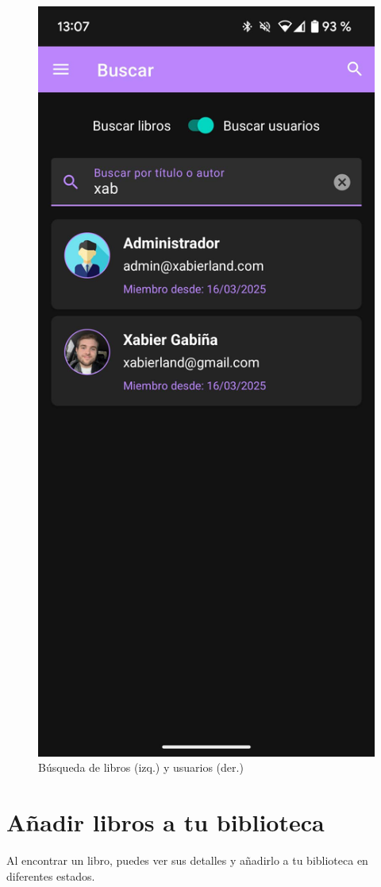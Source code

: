 \documentclass[a4paper,12pt]{report}
\begin{document}
\begin{multicols}{2}
\begin{figure}[H]
          \includegraphics[width=0.47\linewidth]{.img/buscador-usuarios.png}
          \caption{Búsqueda de libros (izq.) y usuarios (der.)}
        \end{figure}
        \vspace{-0.8em}  %
        
        \section{Añadir libros a tu biblioteca}
        \vspace{-0.8em}  %
        Al encontrar un libro, puedes ver sus detalles y añadirlo a tu biblioteca en diferentes estados.
        

\end{multicols}
\end{document}
